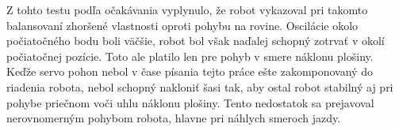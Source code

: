 Z tohto testu podľa očakávania vyplynulo, že robot vykazoval pri takomto balansovaní zhoršené vlastnosti oproti pohybu na rovine. Oscilácie okolo počiatočného bodu boli väčšie, robot bol však naďalej schopný zotrvať v okolí počiatočnej pozície. Toto ale platilo len pre pohyb v smere náklonu plošiny. Keďže servo pohon nebol v čase písania tejto práce ešte zakomponovaný do riadenia robota, nebol schopný nakloniť šasi tak, aby ostal robot stabilný aj pri pohybe priečnom voči uhlu náklonu plošiny. Tento nedostatok sa prejavoval nerovnomerným pohybom robota, hlavne pri náhlych smeroch jazdy.  


